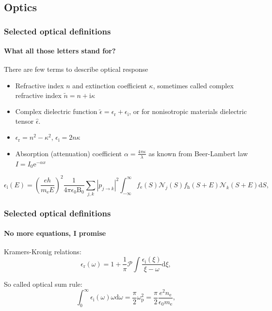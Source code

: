 \documentclass{beamer}
\begin{document}
\subsection{Optics}
\begin{frame}
    \frametitle{Selected optical definitions}
    \framesubtitle{What all those letters stand for?}

	There are few terms to describe optical response

	\begin{itemize}
	\item Refractive index $n$ and extinction coefficient $\kappa$, sometimes called complex refractive index $\tilde{n} = n + \mathrm{i} \kappa$
	\item Complex dielectric function $\tilde{\epsilon} = \epsilon_\mathrm{r} + \epsilon_\mathrm{i}$, or for nonisotropic materials dielectric tensor $\hat{\epsilon}$.
	\item $\epsilon_\mathrm{r} = n^2 - \kappa^2 $, $\epsilon_\mathrm{i} = 2 n \kappa$
	\item Absorption (attenuation) coefficient $\alpha = \frac{4 \pi \kappa}{\lambda}$ as known from Beer-Lambert law $I = I_0 \mathrm{e}^{-\alpha x}$  
	\end{itemize} 
	\small
	\begin{equation}	
	\epsilon_\mathrm{i} (E) = 
\left(\frac{eh}{m_\mathrm{e}E} \right)^2 \frac{1}{4 \pi \epsilon_0 \mathrm{B}_0} \sum_{j,k} | p_{j \rightarrow k} |^2
\int_{-\infty}^\infty f_\mathrm{e}(S) \mathcal{N}_j(S) f_\mathrm{h}(S+E) \mathcal{N}_k(S + E)\mathrm{d}S \text{,}
	\end{equation}
	\normalsize
\end{frame}

\begin{frame}
    \frametitle{Selected optical definitions}
    \framesubtitle{No more equations, I promise}

Kramers-Kronig relations:
\begin{equation}
\epsilon_\mathrm{r}(\omega) = 1 + \frac{1}{\pi} \mathcal{P} \int \frac{\epsilon_\mathrm{i}(\xi)}{\xi - \omega} \mathrm{d}\xi \mathrm{,}
\label{KKint}
\end{equation}

So called optical sum rule:
\begin{equation}
\int_0^\infty \epsilon_\mathrm{i} (\omega) \omega \mathrm{d} \omega = \frac{\pi}{2} \omega_\mathrm{p}^2 = \frac{\pi}{2} \frac{e^2 n_\mathrm{e}}{ \epsilon_0 m_\mathrm{e}} \mathrm{,}
\end{equation}

\end{frame}
\end{document}
